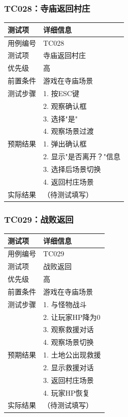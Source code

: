 \documentclass[a4paper,12pt]{article}
\begin{document}
\subsubsection{TC028：寺庙返回村庄}
\begin{table}[h]
\centering
\begin{tabular}{ll}
\toprule
测试项 & 详细信息 \\
\midrule
用例编号 & TC028 \\
测试项 & 寺庙返回村庄 \\
优先级 & 高 \\
前置条件 & 游戏在寺庙场景 \\
测试步骤 & 1. 按ESC键 \\
 & 2. 观察确认框 \\
 & 3. 选择"是" \\
 & 4. 观察场景过渡 \\
预期结果 & 1. 弹出确认框 \\
 & 2. 显示"是否离开？"信息 \\
 & 3. 选择后场景切换 \\
 & 4. 返回村庄场景 \\
实际结果 & （待测试填写） \\
\bottomrule
\end{tabular}
\end{table}

\subsubsection{TC029：战败返回}
\begin{table}[h]
\centering
\begin{tabular}{ll}
\toprule
测试项 & 详细信息 \\
\midrule
用例编号 & TC029 \\
测试项 & 战败返回 \\
优先级 & 高 \\
前置条件 & 游戏在寺庙场景 \\
测试步骤 & 1. 与怪物战斗 \\
 & 2. 让玩家HP降为0 \\
 & 3. 观察救援对话 \\
 & 4. 观察场景切换 \\
预期结果 & 1. 土地公出现救援 \\
 & 2. 显示救援对话 \\
 & 3. 返回村庄场景 \\
 & 4. 玩家HP恢复 \\
实际结果 & （待测试填写） \\
\bottomrule
\end{tabular}
\end{table}
\end{document}

